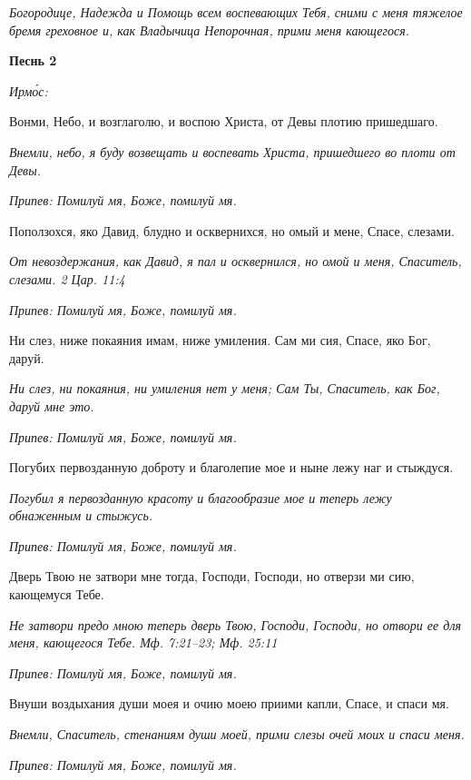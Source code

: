 \itshape Богородице, Надежда и Помощь всем воспевающих Тебя, сними с меня тяжелое бремя греховное и, как Владычица Непорочная, прими меня кающегося.\normalfont{}





\bfseries Песнь 2\normalfont{}


\itshape Ирмо́с:\normalfont{}


Вонми, Небо, и возглаголю, и воспою Христа, от Девы плотию пришедшаго.


\itshape Внемли, небо, я буду возвещать и воспевать Христа, пришедшего во плоти от Девы.\normalfont{}


\itshape Припев:\normalfont{} Помилуй мя, Боже, помилуй мя.


Поползохся, яко Давид, блудно и осквернихся, но омый и мене, Спасе, слезами.


\itshape От невоздержания, как Давид, я пал и осквернился, но омой и меня, Спаситель, слезами. 2 Цар. 11:4\normalfont{}


\itshape Припев:\normalfont{} Помилуй мя, Боже, помилуй мя.


Ни слез, ниже покаяния имам, ниже умиления. Сам ми сия, Спасе, яко Бог, даруй.


\itshape Ни слез, ни покаяния, ни умиления нет у меня; Сам Ты, Спаситель, как Бог, даруй мне это.\normalfont{}


\itshape Припев:\normalfont{} Помилуй мя, Боже, помилуй мя.


Погубих первозданную доброту и благолепие мое и ныне лежу наг и стыждуся.


\itshape Погубил я первозданную красоту и благообразие мое и теперь лежу обнаженным и стыжусь.\normalfont{}


\itshape Припев:\normalfont{} Помилуй мя, Боже, помилуй мя.


Дверь Твою не затвори мне тогда, Господи, Господи, но отверзи ми сию, кающемуся Тебе.


\itshape Не затвори предо мною теперь дверь Твою, Господи, Господи, но отвори ее для меня, кающегося Тебе. Мф. 7:21–23; Мф. 25:11\normalfont{}


\itshape Припев:\normalfont{} Помилуй мя, Боже, помилуй мя.


Внуши воздыхания души моея и очию моею приими капли, Спасе, и спаси мя.


\itshape Внемли, Спаситель, стенаниям души моей, прими слезы очей моих и спаси меня.\normalfont{}


\itshape Припев:\normalfont{} Помилуй мя, Боже, помилуй мя.


